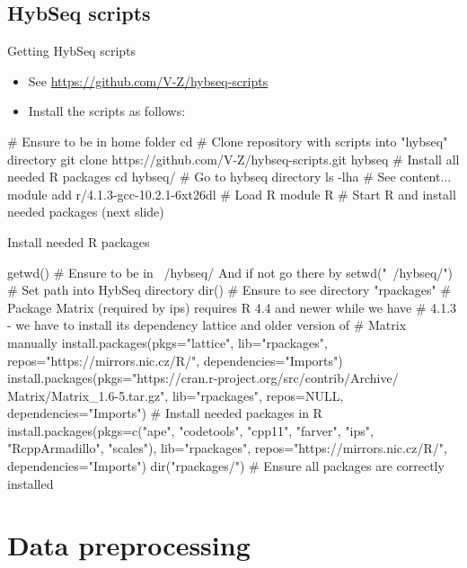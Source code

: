 \documentclass[compress,  xelatex, 11pt, xcolor=x11names, aspectratio=169,
	hyperref={
		bookmarks=true,
		unicode=true,
		colorlinks=true,
		pdftitle={HybSeq course},
		plainpages=false,
		pdfauthor={Vojtech Zeisek},
		pdfsubject={Practical processing of HybSeq target enrichment sequencing data on computing grids like MetaCentrum},
		pdfcreator={XeLaTeX},
		pdfkeywords={BASH, command line, GNU, HybSeq, Linux, MetaCentrum, sequencing shell, target enrichment},
		linkcolor=Turquoise4, %
		anchorcolor=DodgerBlue4, %
		citecolor=DodgerBlue4, %
		filecolor=DodgerBlue4, %
		menucolor=Tan4, %
		urlcolor=DarkOliveGreen4 %
		},
	url={hyphens, lowtilde} %
	]{beamer}
\begin{document}
\subsection{HybSeq scripts}

\begin{frame}[fragile]{Getting HybSeq scripts}
	\begin{itemize}
		\item See \url{https://github.com/V-Z/hybseq-scripts}
		\item Install the scripts as follows:
	\end{itemize}
	\begin{bashcode}
    # Ensure to be in home folder
    cd
    # Clone repository with scripts into "hybseq" directory
    git clone https://github.com/V-Z/hybseq-scripts.git hybseq
    # Install all needed R packages
    cd hybseq/ # Go to hybseq directory
    ls -lha # See content...
    module add r/4.1.3-gcc-10.2.1-6xt26dl # Load R module
    R # Start R and install needed packages (next slide)
	\end{bashcode}
	\end{frame}

\begin{frame}[fragile]{Install needed R packages}
	\begin{spluscode}
    getwd() # Ensure to be in ~/hybseq/ And if not go there by
    setwd("~/hybseq/") # Set path into HybSeq directory
    dir() # Ensure to see directory "rpackages"
    # Package Matrix (required by ips) requires R 4.4 and newer while we have
    # 4.1.3 - we have to install its dependency lattice and older version of
    # Matrix manually
    install.packages(pkgs="lattice", lib="rpackages",
      repos="https://mirrors.nic.cz/R/", dependencies="Imports")
    install.packages(pkgs="https://cran.r-project.org/src/contrib/Archive/
      Matrix/Matrix_1.6-5.tar.gz", lib="rpackages", repos=NULL,
      dependencies="Imports")
    # Install needed packages in R
    install.packages(pkgs=c("ape", "codetools", "cpp11", "farver",
      "ips", "RcppArmadillo", "scales"), lib="rpackages",
      repos="https://mirrors.nic.cz/R/", dependencies="Imports")
    dir("rpackages/") # Ensure all packages are correctly installed
	\end{spluscode}
\end{frame}

\section{Data preprocessing}
\end{document}
